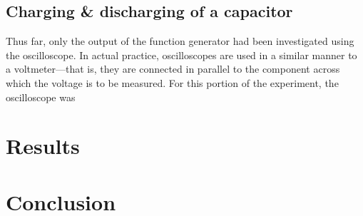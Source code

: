 \documentclass{article}
\begin{document}


    \subsection{Charging \& discharging of a capacitor}
        Thus far, only the output of the function generator had been investigated using the oscilloscope. In actual practice, oscilloscopes are used in a similar manner to a voltmeter---that is, they are connected in parallel to the component across which the voltage is to be measured. %
        For this portion of the experiment, the oscilloscope was 

\section{Results}
\begin{table}
    
\end{table}

\section{Conclusion}
\end{document}

